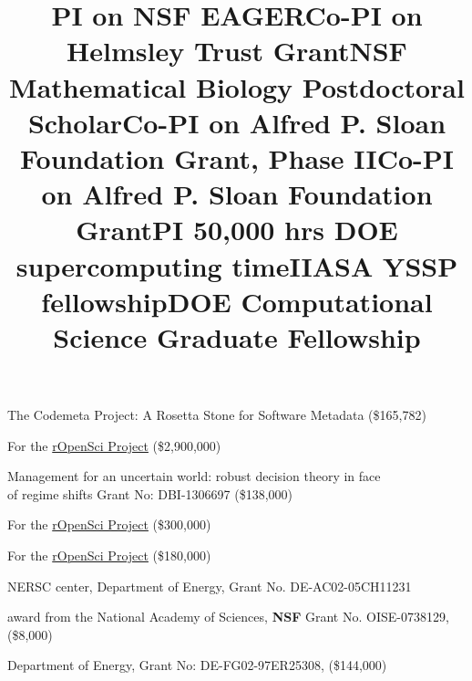 \documentclass[margin]{res}
\begin{document}
\begin{resume}
\title{PI on \textbf{NSF} EAGER}
\begin{position}
  The Codemeta Project: A Rosetta Stone for Software Metadata (\$165,782)
  \vspace{-.25cm}
\end{position}

\title{Co-PI on \textbf{Helmsley Trust} Grant}
\begin{position}
  For the \href{http://ropensci.org}{rOpenSci Project}  (\$2,900,000)
  \vspace{-.25cm}
\end{position}


\title{\textbf{NSF} Mathematical Biology Postdoctoral Scholar}
\begin{position}
  Management for an uncertain world: robust decision theory in face \\
  of regime shifts Grant No:  DBI-1306697 (\$138,000)
  \vspace{-.25cm}
\end{position}

\title{Co-PI on \textbf{Alfred P. Sloan Foundation} Grant, Phase II}
\begin{position}
  For the \href{http://ropensci.org}{rOpenSci Project}  (\$300,000)
  \vspace{-.25cm}
\end{position}


\title{Co-PI on \textbf{Alfred P. Sloan Foundation} Grant}
\begin{position}
  For the \href{http://ropensci.org}{rOpenSci Project}  (\$180,000)
  \vspace{-.25cm}
\end{position}

\title{PI 50,000 hrs \textbf{DOE} supercomputing time}
\begin{position} 
  NERSC center, Department of Energy, Grant No. DE-AC02-05CH11231
  \vspace{-.25cm}
\end{position}

\title{\textbf{IIASA} YSSP fellowship}
\begin{position} 
  award from the National Academy of Sciences, \textbf{NSF} Grant No. OISE-0738129, (\$8,000)
  \vspace{-.25cm}
\end{position}

\title{\textbf{DOE} Computational Science Graduate Fellowship}
\begin{position} 
  Department of Energy, Grant No: DE-FG02-97ER25308, (\$144,000)
  \vspace{-.25cm}
\end{position}



\end{resume}
\end{document}
